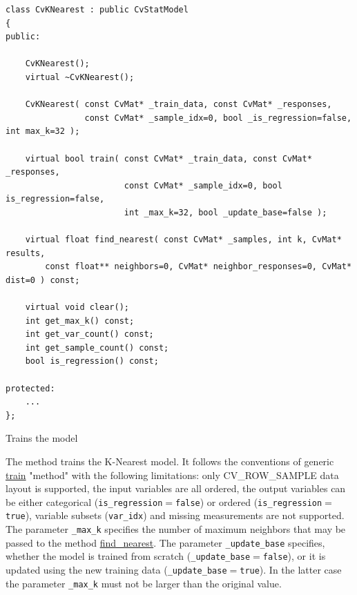 \begin{lstlisting}
class CvKNearest : public CvStatModel
{
public:

    CvKNearest();
    virtual ~CvKNearest();

    CvKNearest( const CvMat* _train_data, const CvMat* _responses,
                const CvMat* _sample_idx=0, bool _is_regression=false, int max_k=32 );

    virtual bool train( const CvMat* _train_data, const CvMat* _responses,
                        const CvMat* _sample_idx=0, bool is_regression=false,
                        int _max_k=32, bool _update_base=false );

    virtual float find_nearest( const CvMat* _samples, int k, CvMat* results,
        const float** neighbors=0, CvMat* neighbor_responses=0, CvMat* dist=0 ) const;

    virtual void clear();
    int get_max_k() const;
    int get_var_count() const;
    int get_sample_count() const;
    bool is_regression() const;

protected:
    ...
};
\end{lstlisting}




Trains the model


The method trains the K-Nearest model. It follows the conventions of generic \href{#CvStatModel_train}{train} "method" with the following limitations: only CV\_ROW\_SAMPLE data layout is supported, the input variables are all ordered, the output variables can be either categorical (\texttt{is\_regression$=$false}) or ordered (\texttt{is\_regression$=$true}), variable subsets (\texttt{var\_idx}) and missing measurements are not supported.
\newline
\newline
The parameter \texttt{\_max\_k} specifies the number of maximum neighbors that may be passed to the method \href{#CvKNearest.3A.3Afindnearest}{find\_nearest}.
\newline
\newline
The parameter \texttt{\_update\_base} specifies, whether the model is trained from scratch (\texttt{\_update\_base$=$false}), or it is updated using the new training data (\texttt{\_update\_base$=$true}). In the latter case the parameter \texttt{\_max\_k} must not be larger than the original value.


